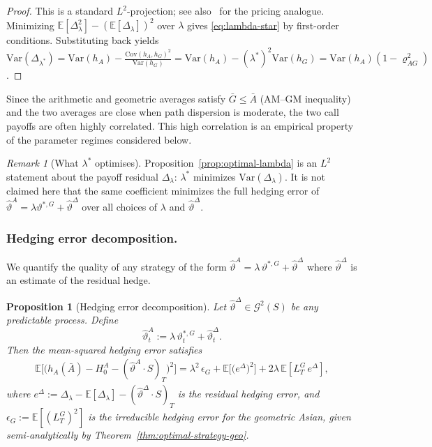 \documentclass[10pt,a4paper,reqno]{amsart}
\theoremstyle{plain}
\newtheorem{proposition}[theorem]{Proposition}
\theoremstyle{definition}
\theoremstyle{remark}
\newtheorem{remark}[theorem]{Remark}
\theoremstyle{example}
\begin{document}
\begin{proof}
This is a standard $L^2$-projection; see also~\cite[Section~4.1]{glasserman2004monte} for the pricing analogue. Minimizing $\mathbb{E}[\Delta_\lambda^2]-(\mathbb{E}[\Delta_\lambda])^2$ over $\lambda$ gives \eqref{eq:lambda-star} by first-order conditions. Substituting back yields $\mathrm{Var}(\Delta_{\lambda^*})=\mathrm{Var}(h_A)-\frac{\mathrm{Cov}(h_A,h_G)^2}{\mathrm{Var}(h_G)}=\mathrm{Var}(h_A)-(\lambda^*)^2\mathrm{Var}(h_G)=\mathrm{Var}(h_A)(1-\varrho_{AG}^2)$.
\end{proof}

Since the arithmetic and geometric averages satisfy $\bar G\leq \bar A$ (AM--GM inequality) and the two averages are close when path dispersion is moderate, the two call payoffs are often highly correlated. This high correlation is an empirical property of the parameter regimes considered below.

\begin{remark}[What $\lambda^*$ optimises]\label{rem:lambda-scope}
Proposition~\ref{prop:optimal-lambda} is an $L^2$ statement about the payoff residual $\Delta_\lambda$: $\lambda^*$ minimizes $\mathrm{Var}(\Delta_\lambda)$. It is not claimed here that the same coefficient minimizes the full hedging error of $\hat\vartheta^A=\lambda\vartheta^{*,G}+\hat\vartheta^\Delta$ over all choices of $\lambda$ and $\hat\vartheta^\Delta$.
\end{remark}

\subsubsection*{Hedging error decomposition.}
We quantify the quality of any strategy of the form $\hat\vartheta^A = \lambda\,\vartheta^{*,G}+\hat\vartheta^{\Delta}$ where $\hat\vartheta^{\Delta}$ is an estimate of the residual hedge.

\begin{proposition}[Hedging error decomposition]\label{prop:hedge-error-decomp}
Let $\hat\vartheta^{\Delta}\in \mathcal{G}^2(S)$ be any predictable process. Define
$$
  \hat\vartheta_t^A := \lambda\,\vartheta_t^{*,G} + \hat\vartheta_t^{\Delta}.
$$
Then the mean-squared hedging error satisfies
\begin{align}\label{eq:mse-decomposition}
  \mathbb{E}\big[\big(h_A(\bar A) - H_0^A - (\hat\vartheta^A\cdot S)_T\big)^2\big]
  = \lambda^2\,\epsilon_G + \mathbb{E}\big[\big(e^\Delta\big)^2\big] + 2\lambda\,\mathbb{E}[L_T^G\, e^{\Delta}],
\end{align}
where $e^\Delta := \Delta_\lambda - \mathbb{E}[\Delta_\lambda] - (\hat\vartheta^{\Delta}\cdot S)_T$ is the residual hedging error, and $\epsilon_G:=\mathbb{E}[(L_T^G)^2]$ is the irreducible hedging error for the geometric Asian, given semi-analytically by Theorem~\ref{thm:optimal-strategy-geo}.
\end{proposition}
\end{document}
